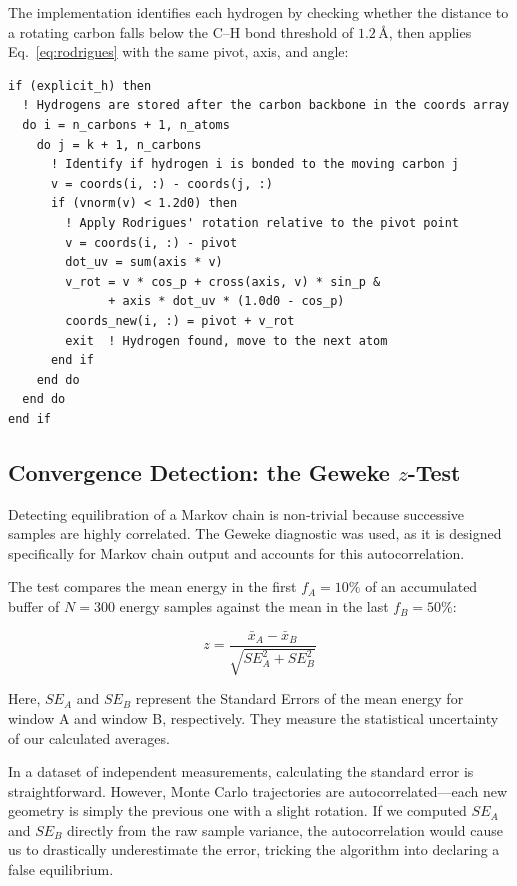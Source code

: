 \documentclass[11pt, a4paper]{article}
\begin{document}
The implementation identifies each hydrogen by checking whether the distance
to a rotating carbon falls below the C--H bond threshold of $1.2\,\text{\AA}$,
then applies Eq.~\eqref{eq:rodrigues} with the same pivot, axis, and angle:

\begin{lstlisting}[caption={Pivot move --- hydrogen rotation in AA mode.}]
if (explicit_h) then
  ! Hydrogens are stored after the carbon backbone in the coords array
  do i = n_carbons + 1, n_atoms
    do j = k + 1, n_carbons
      ! Identify if hydrogen i is bonded to the moving carbon j
      v = coords(i, :) - coords(j, :)
      if (vnorm(v) < 1.2d0) then
        ! Apply Rodrigues' rotation relative to the pivot point
        v = coords(i, :) - pivot
        dot_uv = sum(axis * v)
        v_rot = v * cos_p + cross(axis, v) * sin_p &
              + axis * dot_uv * (1.0d0 - cos_p)
        coords_new(i, :) = pivot + v_rot
        exit  ! Hydrogen found, move to the next atom
      end if
    end do
  end do
end if
\end{lstlisting}

\subsection{Convergence Detection: the Geweke $z$-Test}
\label{sec:geweke}

Detecting equilibration of a Markov chain is non-trivial because successive
samples are highly correlated. The Geweke diagnostic was used, as it is designed specifically for Markov chain
output and accounts for this autocorrelation.

The test compares the mean energy in the first $f_A = 10\%$ of an accumulated
buffer of $N = 300$ energy samples against the mean in the last $f_B = 50\%$:

\begin{equation}
  z = \frac{\bar{x}_A - \bar{x}_B}{\sqrt{SE_A^2 + SE_B^2}}
  \label{eq:geweke}
\end{equation}

Here, $SE_A$ and $SE_B$ represent the Standard Errors of the mean energy
for window A and window B, respectively. They measure the statistical uncertainty 
of our calculated averages. 

In a dataset of independent measurements, calculating the standard error is 
straightforward. However, Monte Carlo trajectories are autocorrelated---each 
new geometry is simply the previous one with a slight rotation. If we computed 
$SE_A$ and $SE_B$ directly from the raw sample variance, the autocorrelation 
would cause us to drastically underestimate the error, tricking the algorithm 
into declaring a false equilibrium.
\end{document}

